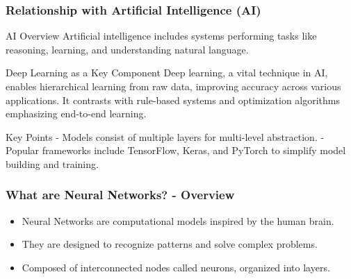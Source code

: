\documentclass[aspectratio=169]{beamer}
\begin{document}
\begin{frame}[fragile]
    \frametitle{Relationship with Artificial Intelligence (AI)}
    
    \begin{block}{AI Overview}
        Artificial intelligence includes systems performing tasks like reasoning, learning, and understanding natural language.
    \end{block}
    
    \begin{block}{Deep Learning as a Key Component}
        Deep learning, a vital technique in AI, enables hierarchical learning from raw data, improving accuracy across various applications. It contrasts with rule-based systems and optimization algorithms emphasizing end-to-end learning.
    \end{block}
    
    \begin{block}{Key Points}
        - Models consist of multiple layers for multi-level abstraction.
        - Popular frameworks include TensorFlow, Keras, and PyTorch to simplify model building and training.
    \end{block}
\end{frame}

\begin{frame}[fragile]
    \frametitle{What are Neural Networks? - Overview}
    \begin{itemize}
        \item Neural Networks are computational models inspired by the human brain.
        \item They are designed to recognize patterns and solve complex problems.
        \item Composed of interconnected nodes called neurons, organized into layers.
    \end{itemize}
\end{frame}
\end{document}
